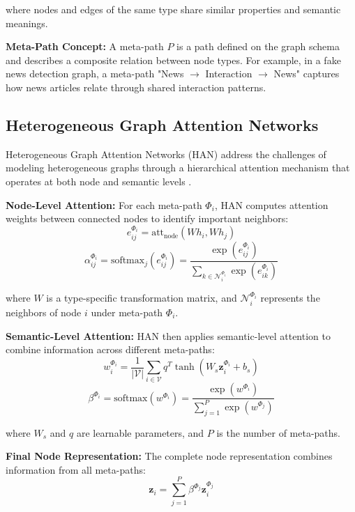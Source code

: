 where nodes and edges of the same type share similar properties and semantic meanings.

\textbf{Meta-Path Concept:} A meta-path $P$ is a path defined on the graph schema and describes a composite relation between node types. For example, in a fake news detection graph, a meta-path "News $\rightarrow$ Interaction $\rightarrow$ News" captures how news articles relate through shared interaction patterns.

\subsection{Heterogeneous Graph Attention Networks}

Heterogeneous Graph Attention Networks (HAN) address the challenges of modeling heterogeneous graphs through a hierarchical attention mechanism that operates at both node and semantic levels \cite{wang2019han}.

\textbf{Node-Level Attention:} For each meta-path $\Phi_i$, HAN computes attention weights between connected nodes to identify important neighbors:
\begin{equation}
e_{ij}^{\Phi_i} = \text{att}_{\text{node}}(Wh_i, Wh_j)
\end{equation}
\begin{equation}
\alpha_{ij}^{\Phi_i} = \text{softmax}_j(e_{ij}^{\Phi_i}) = \frac{\exp(e_{ij}^{\Phi_i})}{\sum_{k \in \mathcal{N}_i^{\Phi_i}} \exp(e_{ik}^{\Phi_i})}
\end{equation}

where $W$ is a type-specific transformation matrix, and $\mathcal{N}_i^{\Phi_i}$ represents the neighbors of node $i$ under meta-path $\Phi_i$.

\textbf{Semantic-Level Attention:} HAN then applies semantic-level attention to combine information across different meta-paths:
\begin{equation}
w_i^{\Phi_i} = \frac{1}{|\mathcal{V}|} \sum_{i \in \mathcal{V}} q^T \tanh(W_s \mathbf{z}_i^{\Phi_i} + b_s)
\end{equation}
\begin{equation}
\beta^{\Phi_i} = \text{softmax}(w^{\Phi_i}) = \frac{\exp(w^{\Phi_i})}{\sum_{j=1}^P \exp(w^{\Phi_j})}
\end{equation}

where $W_s$ and $q$ are learnable parameters, and $P$ is the number of meta-paths.

\textbf{Final Node Representation:} The complete node representation combines information from all meta-paths:
\begin{equation}
\mathbf{z}_i = \sum_{j=1}^P \beta^{\Phi_j} \mathbf{z}_i^{\Phi_j}
\end{equation}

